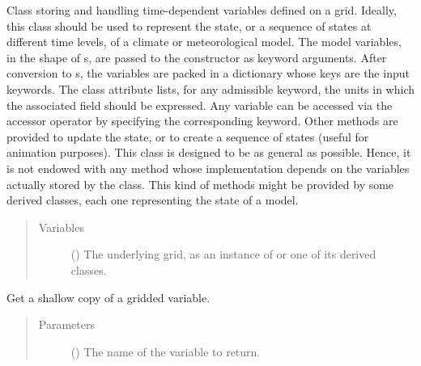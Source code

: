 \documentclass[letterpaper,10pt,english]{sphinxmanual}
\begin{document}
\begin{fulllineitems}
\label{\detokenize{api:tasmania.storages.grid_data.GridData}}
Class storing and handling time-dependent variables defined on a grid. Ideally, this class should be used to
represent the state, or a sequence of states at different time levels, of a  climate or meteorological model.
The model variables, in the shape of s, are passed to the constructor as keyword arguments.
After conversion to s, the variables are packed in a dictionary whose keys are the input keywords.
The class attribute  lists, for any admissible keyword, the units in which the associated field should
be expressed. Any variable can be accessed via the accessor operator by specifying the corresponding
keyword. Other methods are provided to update the state, or to create a sequence of states (useful for animation purposes).
This class is designed to be as general as possible. Hence, it is not endowed with any method whose
implementation depends on the variables actually stored by the class. This kind of methods might be provided by some
derived classes, each one representing the state of a  model.
\begin{quote}\begin{description}
\item[{Variables}] \leavevmode
{} () \textendash{} The underlying grid, as an instance of {\hyperref[\detokenize{api:tasmania.grids.grid_xyz.GridXYZ}]{}} or one of its derived classes.

\end{description}\end{quote}

\begin{fulllineitems}
\label{\detokenize{api:tasmania.storages.grid_data.GridData.__getitem__}}
Get a shallow copy of a gridded variable.
\begin{quote}\begin{description}
\item[{Parameters}] \leavevmode
{} () \textendash{} The name of the variable to return.


\end{description}
\end{quote}
\end{fulllineitems}
\end{fulllineitems}
\end{document}
